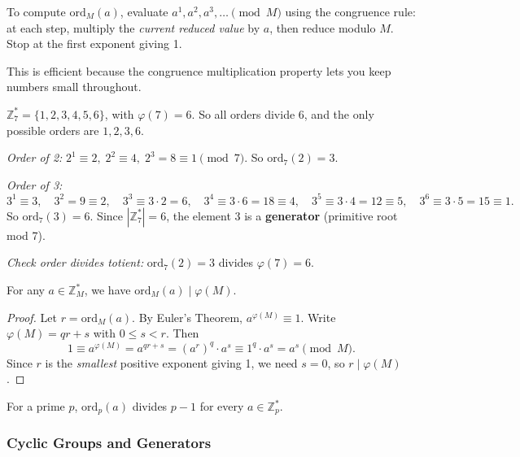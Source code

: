 \begin{remark}
To compute $\mathrm{ord}_M(a)$, evaluate $a^1, a^2, a^3, \ldots \pmod{M}$ using the congruence rule: at each step, multiply the \emph{current reduced value} by $a$, then reduce modulo $M$. Stop at the first exponent giving 1.

This is efficient because the congruence multiplication property lets you keep numbers small throughout.
\end{remark}

\begin{example}
$\mathbb{Z}_7^* = \{1,2,3,4,5,6\}$, with $\varphi(7)=6$. So all orders divide 6, and the only possible orders are $1, 2, 3, 6$.

\medskip
\noindent\textit{Order of 2:}
$2^1\equiv2,\; 2^2\equiv4,\; 2^3=8\equiv1 \pmod{7}$.
So $\mathrm{ord}_7(2) = 3$.

\medskip
\noindent\textit{Order of 3:}
\[
3^1\equiv3,\quad 3^2=9\equiv2,\quad 3^3\equiv3\cdot2=6,\quad 3^4\equiv3\cdot6=18\equiv4,\quad 3^5\equiv3\cdot4=12\equiv5,\quad 3^6\equiv3\cdot5=15\equiv1.
\]
So $\mathrm{ord}_7(3) = 6$. Since $|\mathbb{Z}_7^*|=6$, the element 3 is a \textbf{generator} (primitive root mod 7).

\medskip
\noindent\textit{Check order divides totient:} $\mathrm{ord}_7(2) = 3$ divides $\varphi(7) = 6$. \checkmark
\end{example}

\begin{lemma}
For any $a \in \mathbb{Z}_M^*$, we have $\mathrm{ord}_M(a) \mid \varphi(M)$.
\end{lemma}
\begin{proof}
Let $r = \mathrm{ord}_M(a)$. By Euler's Theorem, $a^{\varphi(M)} \equiv 1$. Write $\varphi(M) = qr + s$ with $0 \le s < r$. Then
\[
1 \equiv a^{\varphi(M)} = a^{qr+s} = (a^r)^q \cdot a^s \equiv 1^q \cdot a^s = a^s \pmod{M}.
\]
Since $r$ is the \emph{smallest} positive exponent giving 1, we need $s = 0$, so $r \mid \varphi(M)$.
\end{proof}

\begin{corollary}
For a prime $p$, $\mathrm{ord}_p(a)$ divides $p-1$ for every $a \in \mathbb{Z}_p^*$.
\end{corollary}

\subsubsection*{Cyclic Groups and Generators}

